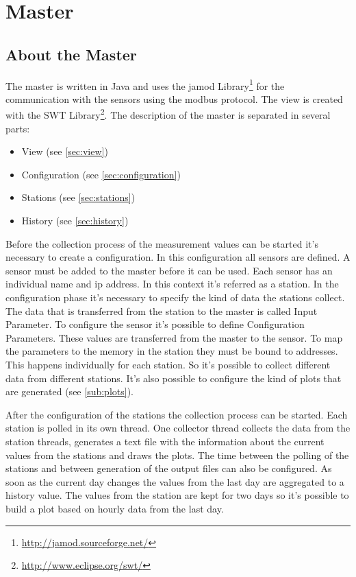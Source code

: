 
\chapter{Master}

\section{About the Master} %
\label{sec:about_the_master}

The master is written in Java and uses the jamod Library\footnote{\url{http://jamod.sourceforge.net/}} for the communication with the sensors using the modbus protocol. The view is created with the SWT Library\footnote{\url{http://www.eclipse.org/swt/}}. 
The description of the master is separated in several parts:
\begin{itemize}
	\item View (see \ref{sec:view})
	\item Configuration (see \ref{sec:configuration})
	\item Stations  (see \ref{sec:stations})
	\item History (see \ref{sec:history})
\end{itemize}

Before the collection process of the measurement values can be started it's necessary to create a configuration. In this configuration all sensors are defined. A sensor must be added to the master before it can be used. Each sensor has an individual name and ip address. In this context it's referred as a station. In the configuration phase it's necessary to specify the kind of data the stations collect. The data that is transferred from the station to the master is called Input Parameter. To configure the sensor it's possible to define Configuration Parameters. These values are transferred from the master to the sensor. To map the parameters to the memory in the station they must be bound to addresses. This happens individually for each station. So it's possible to collect different data from different stations. It's also possible to configure the kind of plots that are generated (see \ref{sub:plots}).

After the configuration of the stations the collection process can be started. Each station is polled in its own thread. One collector thread collects the data from the station threads, generates a text file with the information about the current values from the stations and draws the plots. The time between the polling of the stations and between generation of the output files can also be configured. As soon as the current day changes the values from the last day are aggregated to a history value. The values from the station are kept for two days so it's possible to build a plot based on hourly data from the last day. 

